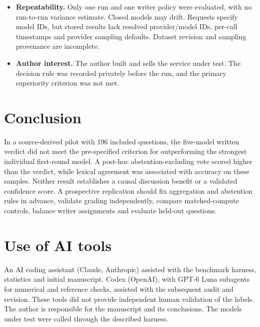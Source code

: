 \documentclass[11pt]{article}
\begin{document}
\begin{itemize}
  \item \textbf{Repeatability.} Only one run and one writer policy were evaluated, with no run-to-run variance estimate. Closed models may drift. Requests specify model IDs, but stored results lack resolved provider/model IDs, per-call timestamps and provider sampling defaults. Dataset revision and sampling provenance are incomplete.
  \item \textbf{Author interest.} The author built and sells the service under test. The decision rule was recorded privately before the run, and the primary superiority criterion was not met.
\end{itemize}

\section{Conclusion}
In a source-derived pilot with 196 included questions, the five-model written verdict did not meet the pre-specified criterion for outperforming the strongest individual first-round model. A post-hoc abstention-excluding vote scored higher than the verdict, while lexical agreement was associated with accuracy on these samples. Neither result establishes a causal discussion benefit or a validated confidence score. A prospective replication should fix aggregation and abstention rules in advance, validate grading independently, compare matched-compute controls, balance writer assignments and evaluate held-out questions.

\section*{Use of AI tools}
An AI coding assistant (Claude, Anthropic) assisted with the benchmark harness, statistics and initial manuscript. Codex (OpenAI), with GPT-6 Luna subagents for numerical and reference checks, assisted with the subsequent audit and revision. These tools did not provide independent human validation of the labels. The author is responsible for the manuscript and its conclusions. The models under test were called through the described harness.
\end{document}

